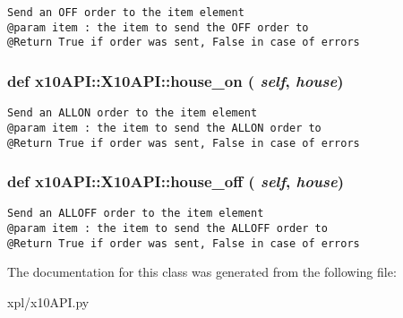 \footnotesize\begin{verbatim}
Send an OFF order to the item element
@param item : the item to send the OFF order to
@Return True if order was sent, False in case of errors
\end{verbatim}
\normalsize
 \hypertarget{classx10API_1_1X10API_d1e63a9dd573eb16a7d1009c72fac15e}{
\subsubsection[house\_\-on]{\setlength{\rightskip}{0pt plus 5cm}def x10API::X10API::house\_\-on ( {\em self}, \/   {\em house})}}
\label{classx10API_1_1X10API_d1e63a9dd573eb16a7d1009c72fac15e}




\footnotesize\begin{verbatim}
Send an ALLON order to the item element
@param item : the item to send the ALLON order to
@Return True if order was sent, False in case of errors
\end{verbatim}
\normalsize
 \hypertarget{classx10API_1_1X10API_b04c7647aa5d80c462f0df36afaff4ec}{
\subsubsection[house\_\-off]{\setlength{\rightskip}{0pt plus 5cm}def x10API::X10API::house\_\-off ( {\em self}, \/   {\em house})}}
\label{classx10API_1_1X10API_b04c7647aa5d80c462f0df36afaff4ec}




\footnotesize\begin{verbatim}
Send an ALLOFF order to the item element
@param item : the item to send the ALLOFF order to
@Return True if order was sent, False in case of errors
\end{verbatim}
\normalsize
 

The documentation for this class was generated from the following file:\begin{CompactItemize}
\item 
xpl/x10API.py\end{CompactItemize}

